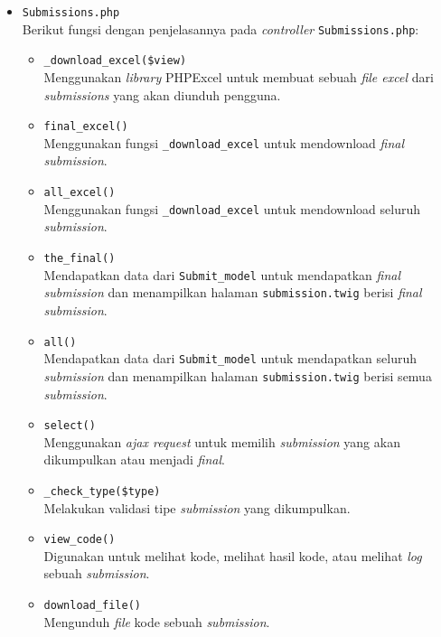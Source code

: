 \begin{itemize}
      \item \verb|Submissions.php| \\
            Berikut fungsi dengan penjelasannya pada \textit{controller} \verb|Submissions.php|:

            \begin{itemize}
                  \item \verb|_download_excel($view)| \\
                        Menggunakan \textit{library} PHPExcel untuk membuat sebuah \textit{file excel} dari \textit{submissions} yang akan diunduh pengguna.
                  \item \verb|final_excel()| \\
                        Menggunakan fungsi \verb|_download_excel| untuk mendownload \textit{final submission}.
                  \item \verb|all_excel()| \\
                        Menggunakan fungsi \verb|_download_excel| untuk mendownload seluruh \textit{submission}.
                  \item \verb|the_final()| \\
                        Mendapatkan data dari \verb|Submit_model| untuk mendapatkan \textit{final submission} dan menampilkan halaman \verb|submission.twig| berisi \textit{final submission}.
                  \item \verb|all()| \\
                        Mendapatkan data dari \verb|Submit_model| untuk mendapatkan seluruh \textit{submission} dan menampilkan halaman \verb|submission.twig| berisi semua \textit{submission}.
                  \item \verb|select()| \\
                        Menggunakan \textit{ajax request} untuk memilih \textit{submission} yang akan dikumpulkan atau menjadi \textit{final}.
                  \item \verb|_check_type($type)| \\
                        Melakukan validasi tipe \textit{submission} yang dikumpulkan.
                  \item \verb|view_code()| \\
                        Digunakan untuk melihat kode, melihat hasil kode, atau melihat \textit{log} sebuah \textit{submission}.
                  \item \verb|download_file()| \\
                        Mengunduh \textit{file} kode sebuah \textit{submission}.
            \end{itemize}


\end{itemize}
